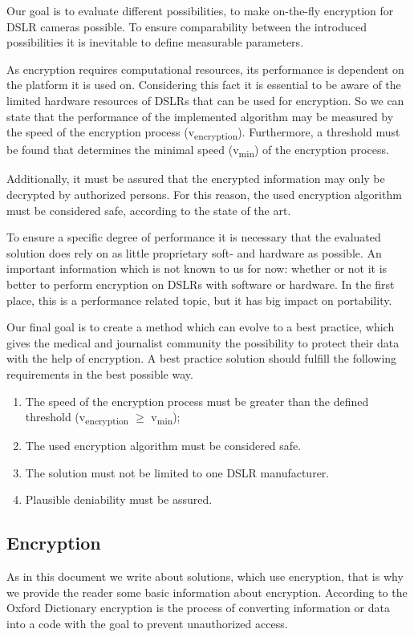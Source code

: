 \documentclass[12pt,a4paper,titlepage,oneside]{scrartcl}
\begin{document}
Our goal is to evaluate different possibilities, to make on-the-fly encryption for DSLR cameras possible.
To ensure comparability between the introduced possibilities it is inevitable to define measurable parameters.

As encryption requires computational resources, its performance is dependent on the platform it is used on.
Considering this fact it is essential to be aware of the limited hardware resources of DSLRs that can be used for encryption.
So we can state that the performance of the implemented algorithm may be measured by the speed of the encryption process (v\textsubscript{encryption}).
Furthermore, a threshold must be found that determines the minimal speed (v\textsubscript{min}) of the encryption process.

Additionally, it must be assured that the encrypted information may only be decrypted by authorized persons.
For this reason, the used encryption algorithm must be considered safe, according to the state of the art.

To ensure a specific degree of performance it is necessary that the evaluated solution does rely on as little proprietary soft- and hardware as possible.
An important information which is not known to us for now: whether or not it is better to perform encryption on DSLRs with software or hardware.
In the first place, this is a performance related topic, but it has big impact on portability.

Our final goal is to create a method which can evolve to a best practice, which gives the medical and journalist community the possibility to protect their data with the help of encryption.
A best practice solution should fulfill the following requirements in the best possible way.
\begin{enumerate}
  \item The speed of the encryption process must be greater than the defined threshold (v\textsubscript{encryption} $\geq$ v\textsubscript{min});
  \item The used encryption algorithm must be considered safe.
  \item The solution must not be limited to one DSLR manufacturer.
  \item Plausible deniability must be assured.
\end{enumerate}

\subsection{Encryption}
As in this document we write about solutions, which use encryption, that is why we provide the reader some basic information about encryption.
According to the Oxford Dictionary encryption is the process of converting information or data into a code with the goal to prevent unauthorized access. \cite{OxforddictEncrypt}
\end{document}
